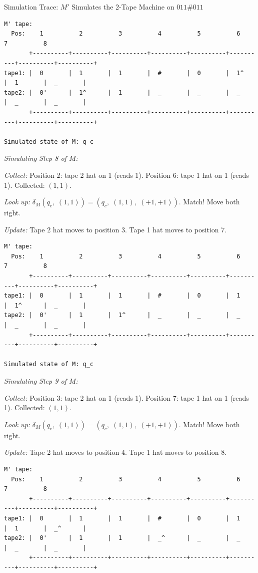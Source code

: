\begin{examplebox}{{Simulation Trace: $M'$ Simulates the 2-Tape Machine on $011\#011$}}
\begin{lstlisting}
M' tape:
  Pos:    1          2          3          4          5          6          7          8
       +----------+----------+----------+----------+----------+----------+----------+----------+
tape1: |  0       |  1       |  1       |  #       |  0       |  1^      |  1       |  _       |
tape2: |  0'      |  1^      |  1       |  _       |  _       |  _       |  _       |  _       |
       +----------+----------+----------+----------+----------+----------+----------+----------+

Simulated state of M: q_c
\end{lstlisting}

\textit{Simulating Step 8 of $M$:}

\textit{Collect:} Position 2: tape 2 hat on 1 (reads 1). Position 6: tape 1 hat on 1 (reads 1). Collected: $(1, 1)$.

\textit{Look up:} $\delta_M(q_c,\;(1, 1)) = (q_c,\;(1, 1),\;(+1, +1))$. Match! Move both right.

\textit{Update:} Tape 2 hat moves to position 3. Tape 1 hat moves to position 7.

\begin{lstlisting}
M' tape:
  Pos:    1          2          3          4          5          6          7          8
       +----------+----------+----------+----------+----------+----------+----------+----------+
tape1: |  0       |  1       |  1       |  #       |  0       |  1       |  1^      |  _       |
tape2: |  0'      |  1       |  1^      |  _       |  _       |  _       |  _       |  _       |
       +----------+----------+----------+----------+----------+----------+----------+----------+

Simulated state of M: q_c
\end{lstlisting}

\textit{Simulating Step 9 of $M$:}

\textit{Collect:} Position 3: tape 2 hat on 1 (reads 1). Position 7: tape 1 hat on 1 (reads 1). Collected: $(1, 1)$.

\textit{Look up:} $\delta_M(q_c,\;(1, 1)) = (q_c,\;(1, 1),\;(+1, +1))$. Match! Move both right.

\textit{Update:} Tape 2 hat moves to position 4. Tape 1 hat moves to position 8.

\begin{lstlisting}
M' tape:
  Pos:    1          2          3          4          5          6          7          8
       +----------+----------+----------+----------+----------+----------+----------+----------+
tape1: |  0       |  1       |  1       |  #       |  0       |  1       |  1       |  _^      |
tape2: |  0'      |  1       |  1       |  _^      |  _       |  _       |  _       |  _       |
       +----------+----------+----------+----------+----------+----------+----------+----------+


\end{lstlisting}
\end{examplebox}
